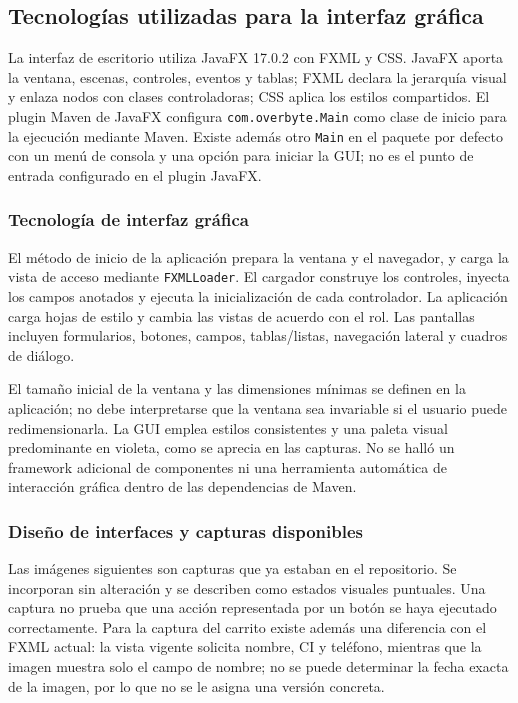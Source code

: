 \subsection{Tecnologías utilizadas para la interfaz gráfica}
\label{subsec:gui-tecnologias}

La interfaz de escritorio utiliza JavaFX 17.0.2 con FXML y CSS. JavaFX aporta la ventana, escenas, controles, eventos y tablas; FXML declara la jerarquía visual y enlaza nodos con clases controladoras; CSS aplica los estilos compartidos. El plugin Maven de JavaFX configura \texttt{com.overbyte.Main} como clase de inicio para la ejecución mediante Maven. Existe además otro \texttt{Main} en el paquete por defecto con un menú de consola y una opción para iniciar la GUI; no es el punto de entrada configurado en el plugin JavaFX.

\subsubsection{Tecnología de interfaz gráfica}

El método de inicio de la aplicación prepara la ventana y el navegador, y carga la vista de acceso mediante \texttt{FXMLLoader}. El cargador construye los controles, inyecta los campos anotados y ejecuta la inicialización de cada controlador. La aplicación carga hojas de estilo y cambia las vistas de acuerdo con el rol. Las pantallas incluyen formularios, botones, campos, tablas/listas, navegación lateral y cuadros de diálogo.

El tamaño inicial de la ventana y las dimensiones mínimas se definen en la aplicación; no debe interpretarse que la ventana sea invariable si el usuario puede redimensionarla. La GUI emplea estilos consistentes y una paleta visual predominante en violeta, como se aprecia en las capturas. No se halló un framework adicional de componentes ni una herramienta automática de interacción gráfica dentro de las dependencias de Maven.

\subsubsection{Diseño de interfaces y capturas disponibles}

Las imágenes siguientes son capturas que ya estaban en el repositorio. Se incorporan sin alteración y se describen como estados visuales puntuales. Una captura no prueba que una acción representada por un botón se haya ejecutado correctamente. Para la captura del carrito existe además una diferencia con el FXML actual: la vista vigente solicita nombre, CI y teléfono, mientras que la imagen muestra solo el campo de nombre; no se puede determinar la fecha exacta de la imagen, por lo que no se le asigna una versión concreta.

